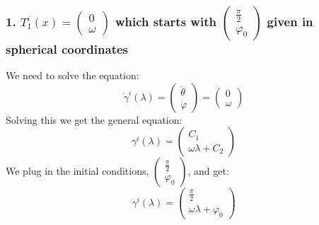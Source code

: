 \documentclass{article}
\begin{document}
\subsubsection*{1. $T_1^i(x)=\left( \begin{array}{c} 0\\\omega \end{array}\right)$ which starts with  $\left( \begin{array}{c} \frac{\pi}{2}\\ \varphi_0 \end{array}\right)$ given in spherical coordinates}
We need to solve the equation:
\begin{equation*}
    \dot{\gamma}^i(\lambda)=
    \left( \begin{array}{c} \dot{\theta}\\\dot{\varphi} \end{array}\right)
    =\left( \begin{array}{c} 0\\\omega \end{array}\right)
\end{equation*}
Solving this we get the general equation:
\begin{equation*}
     \gamma^i(\lambda)=
    \left( \begin{array}{c} C_1\\\omega \lambda + C_2 \end{array}\right)
\end{equation*}
We plug in the initial conditions,  $\left( \begin{array}{c} \frac{\pi}{2}\\ \varphi_0 \end{array}\right)$, and get:
\begin{equation*}
    \boxed{ \gamma^i(\lambda)=
    \left( \begin{array}{c} \frac{\pi}{2}\\\omega \lambda + \varphi_0 \end{array}\right)}
\end{equation*}
\end{document}
